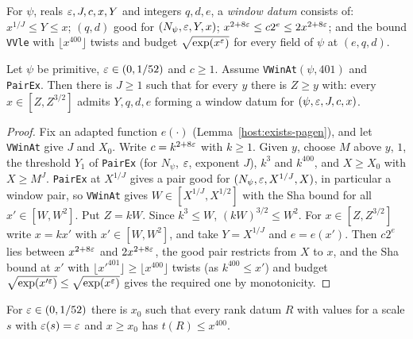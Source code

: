 \begin{definition}\label{host:win-datum}
For $\psi$, reals $\varepsilon,J,c,x,Y$ and integers $q,d,e$, a \emph{window
datum} consists of: $x^{1/J}\le Y\le x$; $(q,d)$ good for
$(N_{\psi},\varepsilon,Y,x)$; $x^{2+8\varepsilon}\le c2^e\le2x^{2+8\varepsilon}$; and the bound
\texttt{VVle} with $\lfloor x^{400}\rfloor$ twists and budget
$\sqrt{\exp(x^{\varepsilon})}$ for every field of $\psi$ at $(e,q,d)$.
\end{definition}

\begin{lemma}\label{host:win-pairs}
Let $\psi$ be primitive, $\varepsilon\in(0,1/52)$ and $c\ge1$. Assume
\texttt{VWinAt}$(\psi,401)$ and \texttt{PairEx}. Then there is $J\ge1$ such
that for every $y$ there is $Z\ge y$ with: every $x\in[Z,Z^{3/2}]$ admits
$Y,q,d,e$ forming a window datum for $(\psi,\varepsilon,J,c,x)$.
\end{lemma}
\begin{proof}
Fix an adapted function $e(\cdot)$ (Lemma~\ref{host:exists-pagen}), and
let \texttt{VWinAt} give $J$ and $X_0$. Write $c=k^{2+8\varepsilon}$ with $k\ge1$.
Given $y$, choose $M$ above $y$, $1$, the threshold $Y_1$ of \texttt{PairEx}
(for $N_{\psi}$, $\varepsilon$, exponent $J$), $k^3$ and $k^{400}$, and $X\ge X_0$
with $X\ge M^J$. \texttt{PairEx} at $X^{1/J}$ gives a pair good for
$(N_{\psi},\varepsilon,X^{1/J},X)$, in particular a window pair, so \texttt{VWinAt}
gives $W\in[X^{1/J},X^{1/2}]$ with the Sha bound for all $x'\in[W,W^2]$.
Put $Z=kW$. Since $k^3\le W$, $(kW)^{3/2}\le W^2$. For $x\in[Z,Z^{3/2}]$
write $x=kx'$ with $x'\in[W,W^2]$, and take $Y=X^{1/J}$ and $e=e(x')$.
Then $c2^{e}$ lies between $x^{2+8\varepsilon}$ and $2x^{2+8\varepsilon}$, the good pair
restricts from $X$ to $x$, and the Sha bound at $x'$ with $\lfloor
x'^{401}\rfloor\ge\lfloor x^{400}\rfloor$ twists (as $k^{400}\le x'$) and
budget $\sqrt{\exp(x'^{\varepsilon})}\le\sqrt{\exp(x^{\varepsilon})}$ gives the required
one by monotonicity.
\end{proof}

\begin{lemma}\label{host:rank-le}
For $\varepsilon\in(0,1/52)$ there is $x_0$ such that every rank datum $R$ with
values for a scale $s$ with $\varepsilon(s)=\varepsilon$ and $x\ge x_0$ has $t(R)\le
x^{400}$.
\end{lemma}

